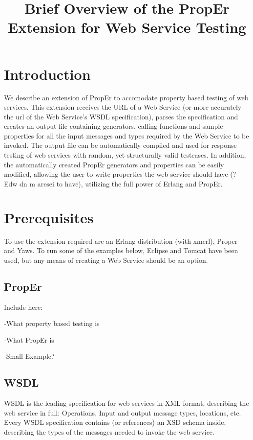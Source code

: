\documentclass[11pt]{article} %
\title{Brief Overview of the PropEr Extension for Web Service Testing}
\date{} %
\begin{document}
\maketitle

\section{Introduction}

We describe an extension of PropEr to accomodate property based testing of web services. This extension receives the URL of a Web Service (or more accurately the url of the Web Service's WSDL specification), parses the specification and creates an output file containing generators, calling functions and sample properties for all the input messages and types required by the Web Service to be invoked. The output file can be automatically compiled and used for response testing of web services with random, yet structurally valid testcases. In addition, the automatically created PropEr generators and properties can be easily modified, allowing the user to write properties the web service should have (? Edw dn m aresei to have), utilizing the full power of Erlang and PropEr.

\section{Prerequisites}

To use the extension required are an Erlang distribution (with xmerl), Proper and Yaws.
To run some of the examples below, Eclipse and Tomcat have been used, but any means of creating a Web Service should be an option.

\subsection{PropEr}

Include here:

-What property based testing is

-What PropEr is

-Small Example?

\subsection{WSDL}

WSDL is the leading specification for web services in XML format, describing the web service in full: Operations, Input and output message types, locations, etc. Every WSDL specification contains (or references) an XSD schema inside, describing the types of the messages needed to invoke the web service. 
\end{document}
